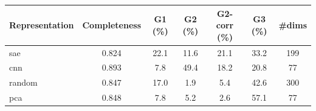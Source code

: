 \begin{tabular}{lcccccc}
\toprule
Representation & Completeness & G1 (\%) & G2 (\%) & G2-corr (\%) & G3 (\%) & \#dims \\
\midrule
sae & 0.824 & 22.1 & 11.6 & 21.1 & 33.2 & 199 \\
cnn & 0.893 & 7.8 & 49.4 & 18.2 & 20.8 & 77 \\
random & 0.847 & 17.0 & 1.9 & 5.4 & 42.6 & 300 \\
pca & 0.848 & 7.8 & 5.2 & 2.6 & 57.1 & 77 \\
\bottomrule
\end{tabular}